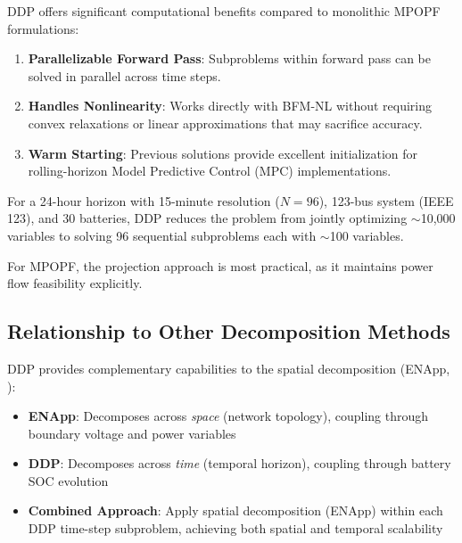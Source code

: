DDP offers significant computational benefits compared to monolithic MPOPF formulations:

\begin{enumerate}        
    \item \textbf{Parallelizable Forward Pass}: Subproblems within forward pass can be solved in parallel across time steps.
    
    \item \textbf{Handles Nonlinearity}: Works directly with BFM-NL \cite{Farivar1} without requiring convex relaxations or linear approximations that may sacrifice accuracy.
    
    \item \textbf{Warm Starting}: Previous solutions provide excellent initialization for rolling-horizon Model Predictive Control (MPC) implementations.
\end{enumerate}

For a 24-hour horizon with 15-minute resolution ($N=96$), 123-bus system (IEEE 123), and 30 batteries, DDP reduces the problem from jointly optimizing $\sim$10,000 variables to solving 96 sequential subproblems each with $\sim$100 variables.


For MPOPF, the projection approach is most practical, as it maintains power flow feasibility explicitly.

\subsection{Relationship to Other Decomposition Methods}

DDP provides complementary capabilities to the spatial decomposition (ENApp, ):

\begin{itemize}
    \item \textbf{ENApp}: Decomposes across \textit{space} (network topology), coupling through boundary voltage and power variables
    \item \textbf{DDP}: Decomposes across \textit{time} (temporal horizon), coupling through battery SOC evolution
    \item \textbf{Combined Approach}: Apply spatial decomposition (ENApp) within each DDP time-step subproblem, achieving both spatial and temporal scalability
\end{itemize}

